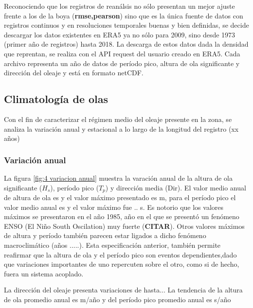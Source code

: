 \documentclass[5p,times,authoryear]{elsarticle}
\begin{document}
Reconociendo que los registros de reanálsis no sólo presentan un mejor ajuste frente a los de la boya (\textbf{rmse,pearson}) sino que es la única fuente de datos con registros continuos y en resoluciones temporales buenas y bien definidas, se decide descargar los datos existentes en ERA5 ya no sólo para 2009, sino desde 1973 (primer año de registros) hasta 2018. La descarga de estos datos dada la densidad que reprentan, se realiza con el API request del usuario creado en ERA5. Cada archivo representa un año de datos de período pico, altura de ola significante y dirección del oleaje y está en formato netCDF.

\subsection{Climatología de olas}

Con el fin de caracterizar el régimen medio del oleaje presente en la zona, se analiza la variación anual y estacional a lo largo de la longitud del registro (xx años)

\subsubsection{Variación anual}

La figura \ref{fig:4 variacion anual} muestra la varación anual de la altura de ola significante ($H_s$), período pico ($T_p$) y dirección media (Dir). El valor medio anual de altura de ola es y  el valor máximo presentado es m, para el período pico el valor medio anual es y el valor máximo fue .. s. Es notorio que los valores máximos se presentaron en el año 1985, año en el que se presentó un fenómeno ENSO (El Niño South Oscilation) muy fuerte (\textbf{CITAR}). Otros valores máximos de altura y período también parecen estar ligados a dicho fenómeno macroclimático (años .....). Esta especificación anterior, también permite reafirmar que la altura de ola y el período pico son eventos dependientes,dado que variaciones importantes de uno repercuten sobre el otro, como si de hecho, fuera un sistema acoplado.

La dirección del oleaje presenta variaciones de hasta... La tendencia de la altura de ola promedio anual es m/año y del período pico promedio anual es s/año
\end{document}
